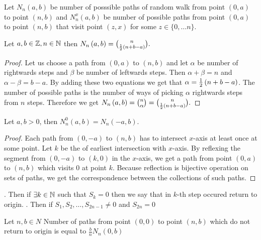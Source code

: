 \begin{defn}\label{defn-number_possible_paths}
 Let $N_n \left( a,b \right) $ be number of posssible paths of random walk \rw from point $ \left( 0,a \right) $ to point $ \left( n,b \right) $ and $N_n^x \left( a,b \right) $ be number of possible paths from point $ \left( 0,a \right) $ to point $ \left( n,b \right) $ that visit point $ \left( z,x \right) $ for some $z \in \{0, \ldots n \}$.
\end{defn}
\begin{thm}\label{thm-number_of_possible_paths}
 Let $a,b \in \mathbb{Z}, n \in \mathbb{N}$ then $N_n \left( a,b \right) =\binom{n}{\frac{1}{2} \left( n+b-a \right) }.$
\end{thm}
\begin{proof}
 Let us choose a path from $ \left( 0,a \right) $ to $ \left( n,b \right) $ and let $\alpha$ be number of rightwards steps and $\beta$ be number of leftwards steps. Then $\alpha+\beta=n$ and $\alpha-\beta=b-a$. By adding these two equations we get that $\alpha=\frac{1}{2} \left( n+b-a \right) $. The number of possible paths is the number of ways of picking $\alpha$ rightwards steps from $n$ steps. Therefore we get $N_n \left( a,b \right) =\binom{n}{\alpha}=\binom{n}{\frac{1}{2} \left( n+b-a \right) }.$
\end{proof}
\begin{thm}\label{thm-reflection_principle}
 Let $a,b >0$, then $N_n^0 \left( a,b \right) =N_n \left( -a,b \right) $.
\end{thm}
\begin{proof}
 Each path from $ \left( 0,-a \right) $ to $ \left( n,b \right) $ has to intersect $x$-axis at least once at some point. Let $k$ be the \Time of earliest intersection with $x$-axis. By reflexing the segment from $ \left( 0,-a \right) $ to $ \left( k,0 \right) $ in the $x$-axis, we get a path from point $ \left( 0,a \right) $ to $ \left( n,b \right) $ which visits $0$ at point $k$. Because reflection is bijective operation on sets of paths, we get the correspondence between the collections of such paths.
\end{proof}
\begin{defn}\label{defn-return_origin1}
 \Lrw. Then if $\exists k \in \mathbb{N}$ such that $S_k=0$ then we say that in $k$-th step occured return to origin.
 \Lrw. Then if $S_1,S_2, \ldots, S_{2n-1}\neq 0$ and $S_{2n}=0$
\end{defn}
\begin{thm}\label{thm-ballot_theorem}
 Let $n,b \in N$
 Number of paths from point $ \left( 0,0 \right) $ to point $ \left( n,b \right) $ which do not return to origin is equal to $\frac{b}{n}N_n \left( 0,b \right) $
\end{thm}
